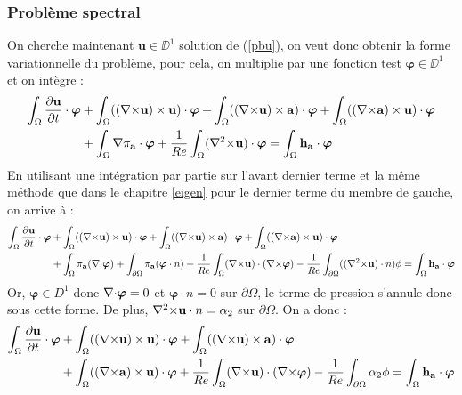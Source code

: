 \subsubsection{Problème spectral}
\label{spectre}

On cherche maintenant $\mathbf{u}\in\DD^1$ solution de (\ref{pbu}), on veut donc obtenir la forme variationnelle du problème, pour cela, on multiplie par une fonction test $\bm{\varphi}\in\DD^1$ et on intègre :
\begin{align*}
\int_\Omega \frac{\partial \mathbf{u}}{\partial t}\cdot \bm{\varphi} &+ \int_\Omega (({\nabla\times} \mathbf{u})\times \mathbf{u})\cdot \bm{\varphi} + \int_\Omega (({\nabla\times} \mathbf{u})\times \mathbf{a})\cdot\bm{\varphi} + \int_\Omega (({\nabla\times} \mathbf{a})\times \mathbf{u})\cdot\bm{\varphi} \\
&+ \int_\Omega {\nabla}\pi_{\mathbf{a}}\cdot\bm{\varphi} + \frac{1}{Re}\int_\Omega ({\nabla^2\times} \mathbf{u})\cdot\bm{\varphi} = \int_\Omega \mathbf{h_a}\cdot\bm{\varphi}
\end{align*}
En utilisant une intégration par partie sur l'avant dernier terme et la même méthode que dans le chapitre \ref{eigen} pour le dernier terme du membre de gauche, on arrive à :
\begin{align*}
\int_\Omega \frac{\partial \mathbf{u}}{\partial t}\cdot \bm{\varphi} &+ \int_\Omega (({\nabla\times} \mathbf{u})\times \mathbf{u})\cdot \bm{\varphi} + \int_\Omega (({\nabla\times} \mathbf{u})\times \mathbf{a})\cdot\bm{\varphi} + \int_\Omega (({\nabla\times} \mathbf{a})\times \mathbf{u})\cdot\bm{\varphi}\\
&+ \int_\Omega \pi_{\mathbf{a}}({\nabla\cdot}\bm{\varphi}) + \int_{\partial \Omega} \pi_{\mathbf{a}}(\bm{\varphi}\cdot n) + \frac{1}{Re}\int_\Omega ({\nabla\times} \mathbf{u})\cdot({\nabla\times}\bm{\varphi}) -\frac{1}{Re}\int_{\partial\Omega} (({\nabla^2\times} \mathbf{u})\cdot n)\phi = \int_\Omega \mathbf{h_a}\cdot\bm{\varphi}
\end{align*}
Or, $\bm{\varphi}\in D^1$ donc ${\nabla\cdot}\bm{\varphi}=0$ et $\bm{\varphi}\cdot n=0$ sur $\partial\Omega$, le terme de pression s'annule donc sous cette forme. De plus, ${\nabla^2\times} \mathbf{u}\cdot n=\alpha_2$ sur $\partial\Omega$. On a donc :
\begin{equation}
\label{fvu}
\begin{aligned}
\int_\Omega \frac{\partial \mathbf{u}}{\partial t}\cdot \bm{\varphi} &+ \int_\Omega (({\nabla\times} \mathbf{u})\times \mathbf{u})\cdot \bm{\varphi} + \int_\Omega (({\nabla\times} \mathbf{u})\times \mathbf{a})\cdot\bm{\varphi} \\
&+ \int_\Omega (({\nabla\times} \mathbf{a})\times \mathbf{u})\cdot\bm{\varphi} + \frac{1}{Re}\int_\Omega ({\nabla\times} \mathbf{u})\cdot({\nabla\times}\bm{\varphi}) -\frac{1}{Re}\int_{\partial\Omega} \alpha_2\phi = \int_\Omega \mathbf{h_a}\cdot\bm{\varphi}
\end{aligned}
\end{equation}

